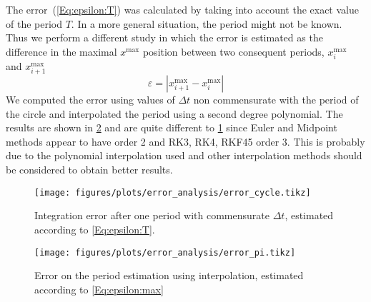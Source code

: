 The error~(\cref{Eq:epsilon:T}) was calculated by taking into account the exact value of the period $T$. In a more general situation, the period might not be known. Thus we perform a different study in which the error is estimated as the difference in the maximal $x^{\max}$ position between two consequent periods, $x^{\max}_i$ and $x^{\max}_{i+1}$
\begin{equation}
\varepsilon = |x^{\max}_{i+1} - x^{\max}_{i}|
\label{Eq:epsilon:max}
\end{equation}
We computed the error using values of $\Delta t$ non commensurate with the period of the circle and interpolated the period using a second degree polynomial. The results are shown in \cref{fig:error_pi} and are quite different to \cref{fig:error_cycle} since Euler and Midpoint methods appear to have order 2 and RK3, RK4, RKF45 order 3. This is probably due to the polynomial interpolation used and other interpolation methods should be considered to obtain better results.


\begin{figure}[H]
    \centering
    \texttt{[image: figures/plots/error\_analysis/error\_cycle.tikz]}
    \caption{Integration error after one period with commensurate $\Delta t$, estimated according to \cref{Eq:epsilon:T}.}
    \label{fig:error_cycle}
\end{figure}

\begin{figure}[H]
    \centering
    \texttt{[image: figures/plots/error\_analysis/error\_pi.tikz]}
    \caption{Error on the period estimation using interpolation, estimated according to \cref{Eq:epsilon:max}}
    \label{fig:error_pi}
\end{figure}
